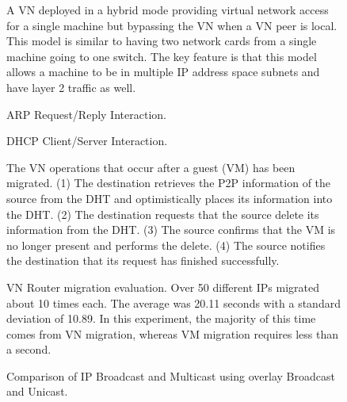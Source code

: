 \begin{figure}[ht]
\centering
{}
\caption[VN Hybrid]{A VN deployed in a hybrid mode providing virtual network
access for a single machine but bypassing the VN when a VN peer is local.  This
model is similar to having two network cards from a single machine going to one
switch.  The key feature is that this model allows a machine to be in multiple
IP address space subnets and have layer 2 traffic as well.}
\label{fig:hybrid}
\end{figure}

\begin{figure}[ht]
\centering
{}
\caption{ARP Request/Reply Interaction.}
\label{fig:arp}
\end{figure}

\begin{figure}[ht]
\centering
{}
\caption{DHCP Client/Server Interaction.}
\label{fig:dhcp}
\end{figure}

\begin{figure}[ht]
\centering
{}
\caption[VN Router Migration]{The VN operations that occur after a guest (VM)
has been migrated.  (1) The destination retrieves the P2P information of the
source from the DHT and optimistically places its information into the DHT.
(2) The destination requests that the source delete its information from the
DHT.  (3)  The source confirms that the VM is no longer present and performs
the delete.  (4)  The source notifies the destination that its request has
finished successfully.}
\label{fig:migration_ring}
\end{figure}

\begin{figure}[ht]
\centering
{}
\caption[VN Router migration evaluation]{VN Router migration evaluation.  Over
50 different IPs migrated about 10 times each.  The average was 20.11 seconds
with a standard deviation of 10.89.  In this experiment, the majority of this
time comes from VN migration, whereas VM migration requires less than a second.}
\label{fig:mig}
\end{figure}

\begin{figure}[ht]
\centering
\caption{Comparison of IP Broadcast and Multicast using overlay Broadcast and
Unicast.}
\label{fig:broadcast}
\end{figure}

